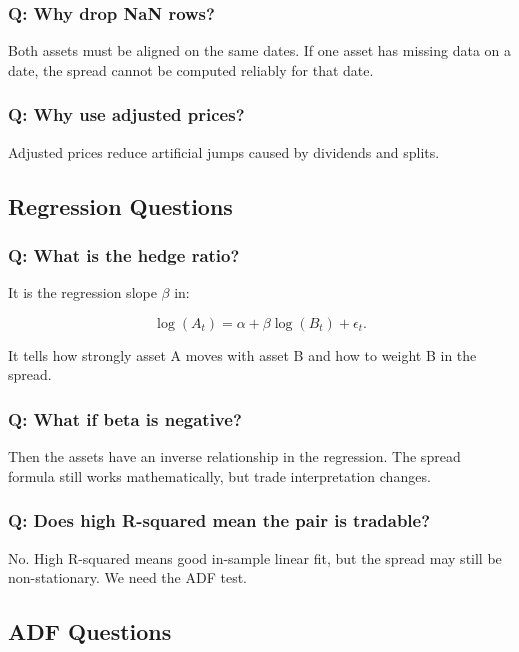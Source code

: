 \documentclass[11pt]{article}
\begin{document}
\subsubsection{Q: Why drop NaN rows?}

Both assets must be aligned on the same dates. If one asset has missing data on
a date, the spread cannot be computed reliably for that date.

\subsubsection{Q: Why use adjusted prices?}

Adjusted prices reduce artificial jumps caused by dividends and splits.

\subsection{Regression Questions}

\subsubsection{Q: What is the hedge ratio?}

It is the regression slope $\beta$ in:

\[
\log(A_t)=\alpha+\beta\log(B_t)+\epsilon_t.
\]

It tells how strongly asset A moves with asset B and how to weight B in the
spread.

\subsubsection{Q: What if beta is negative?}

Then the assets have an inverse relationship in the regression. The spread
formula still works mathematically, but trade interpretation changes.

\subsubsection{Q: Does high R-squared mean the pair is tradable?}

No. High R-squared means good in-sample linear fit, but the spread may still be
non-stationary. We need the ADF test.

\subsection{ADF Questions}
\end{document}
